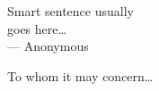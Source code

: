 
\cleardoublepage
\thispagestyle{empty}


\vspace*{3cm}

\begin{raggedleft}
    Smart sentence usually \\
    goes here\dots\\
    --- Anonymous\\
\end{raggedleft}

\vspace{4cm}

\begin{center}
    To whom it may concern\dots
\end{center}


